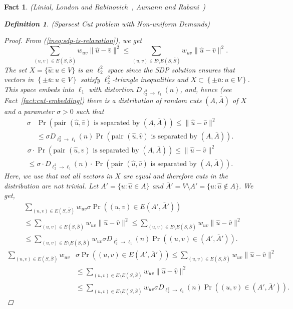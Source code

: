 \documentclass[twoside,leqno,twocolumn]{article}
\newcommand {\set}   [1] {\left\{ #1 \right\}}
\newcommand {\brc}   [1] {\left(#1\right)}
\newcommand {\Prob}  [1] {\Pr \brc{#1 }}
\newtheorem{Definition}[theorem]{Definition}
\newtheorem{fact}[theorem]{Fact}
\begin{document}
\begin{fact}{\sc (Linial, London and Rabinovich~\cite{LLR}, Aumann and Rabani~\cite{AR})}
\begin{Definition} {\sc (Sparsest Cut problem with Non-uniform Demands)}
\begin{proof}
\fi
From (\ref{ineq:sdp-is-relaxation}), we get
$$
\sum_{(u,v)\in E(S,\bar S)} w_{uv} \|\hat u - \hat v\|^2
\leq
\sum_{(u,v)\in E \setminus E(S,\bar S)} w_{uv} \|\hat u - \hat v\|^2
.$$
The set $X= \{\hat u: u\in V\}$ is an $\ell_2^2$ space since the SDP solution ensures that vectors in
$\set{\pm\bar u: u\in V}$ satisfy $\ell_2^2$-triangle inequalities and $X \subset \set{\pm\bar u: u\in V}$.
This space embeds into $\ell_1$ with distortion $D_{\ell_2^2\to \ell_1}(n)$, and, hence (see Fact~\ref{fact:cut-embedding})
there is a distribution of random cuts $(A,\bar A)$ of $X$ and a parameter $\sigma > 0$ such that
\ifSODA
\begin{align*}
\sigma & \Prob{\text{pair }(\hat u,\hat v) \text{ is separated by } (A,\bar A)} \leq \|\hat u -\hat v\|^2 \\
&\leq
\sigma  D_{\ell_2^2\to \ell_1}(n)  \Prob{\text{pair }(\hat u,\hat v) \text{ is separated by } (A,\bar A)}.
\end{align*}
\else
\begin{multline*}
\sigma \cdot \Prob{\text{pair }(\hat u,\hat v) \text{ is separated by } (A,\bar A)} \leq \|\hat u -\hat v\|^2 \\
\leq
\sigma \cdot D_{\ell_2^2\to \ell_1}(n) \cdot \Prob{\text{pair }(\hat u,\hat v) \text{ is separated by } (A,\bar A)}.
\end{multline*}
\fi
Here, we use that not all vectors in $X$ are equal and therefore cuts in the distribution are not trivial.
Let $A' = \{u:\hat u \in A\}$ and $\bar A' = V\setminus A' = \{u:\hat u \notin A\}$. We get, 
\ifSODA
\begin{align*}
&\sum_{(u,v)\in E(S,\bar S)} w_{uv} \sigma \Prob{(u, v) \in E(A',\bar A')} \\
&{}\leq
\sum_{(u,v)\in E(S,\bar S)} w_{uv} \|\hat u - \hat v\|^2
\leq
\sum_{(u,v)\in E\setminus E(S,\bar S)} w_{uv} \|\hat u - \hat v\|^2 \\
&{}\leq \sum_{(u,v)\in E\setminus E(S,\bar S)} w_{uv} \sigma D_{\ell_2^2\to \ell_1}(n) \Prob{(u, v) \in (A',\bar A')}.
\end{align*}
\else
\begin{align*}
\sum_{(u,v)\in E(S,\bar S)} w_{uv} & \sigma \Prob{(u, v) \in E(A',\bar A')} 
\leq
\sum_{(u,v)\in E(S,\bar S)} w_{uv} \|\hat u - \hat v\|^2\\
&\leq
\sum_{(u,v)\in E\setminus E(S,\bar S)} w_{uv} \|\hat u - \hat v\|^2 \\
&\leq \sum_{(u,v)\in E\setminus E(S,\bar S)} w_{uv} \sigma D_{\ell_2^2\to \ell_1}(n) \Prob{(u, v) \in (A',\bar A')}.

\end{align*}
\end{proof}
\end{Definition}
\end{fact}
\end{document}
